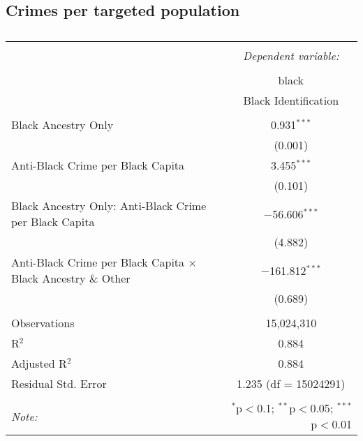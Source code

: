 \documentclass{article}
\begin{document}
\subsection{Crimes per targeted population}
    \begin{table}[!htbp] \centering 
      \caption{} 
      \label{} 
    \begin{tabular}{@{\extracolsep{5pt}}lc} 
    \\[-1.8ex]\hline 
    \hline \\[-1.8ex] 
     & \multicolumn{1}{c}{\textit{Dependent variable:}} \\ 
    \cline{2-2} 
    \\[-1.8ex] & black \\ 
     & Black Identification \\ 
    \hline \\[-1.8ex] 
     Black Ancestry Only & 0.931$^{***}$ \\ 
      & (0.001) \\ 
      Anti-Black Crime per Black Capita  & 3.455$^{***}$ \\ 
      & (0.101) \\ 
     Black Ancestry Only: Anti-Black Crime per Black Capita  & $-$56.606$^{***}$ \\ 
      & (4.882) \\ 
      Anti-Black Crime per Black Capita $\times$ Black Ancestry \& Other & $-$161.812$^{***}$ \\ 
      & (0.689) \\ 
    \hline \\[-1.8ex] 
    Observations & 15,024,310 \\ 
    R$^{2}$ & 0.884 \\ 
    Adjusted R$^{2}$ & 0.884 \\ 
    Residual Std. Error & 1.235 (df = 15024291) \\ 
    \hline 
    \hline \\[-1.8ex] 
    \textit{Note:}  & \multicolumn{1}{r}{$^{*}$p$<$0.1; $^{**}$p$<$0.05; $^{***}$p$<$0.01} \\ 
    \end{tabular} 
    \end{table} 
    
\end{document}
